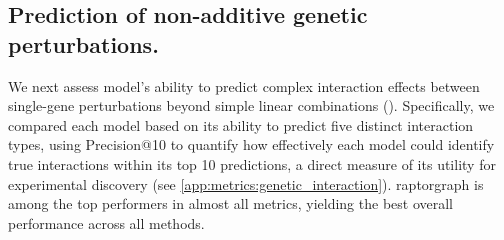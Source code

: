 \begin{table}
    \centering
    \vspace{-10pt}
    \vspace{-0.5\baselineskip}
    \caption{}
    \label{tab:objective_results_replogle}
    \vspace{-\baselineskip}
\end{table}

\subsection{Prediction of non-additive genetic perturbations.} 
We next assess model's ability to predict complex interaction effects between single-gene perturbations beyond simple linear combinations  ().
Specifically, we compared each model based on its ability to predict five distinct interaction types, using Precision@10 to quantify how effectively each model could identify true interactions within its top 10 predictions, a direct measure of its utility for experimental discovery (see \cref{app:metrics:genetic_interaction}). \gls{raptorgraph} is among the top performers in almost all metrics, yielding the best overall performance across all methods.  

\begin{table}[htb]
\centering
\caption{Comparison of non-additive genetic interaction prediction. Precision@10 scores for five baseline models across distinct genetic interaction subtypes on the Norman et al. dataset. Higher is better. Bold: best results; Italics: second best.}
\label{tab:gi_scores}
\vskip 0.15in
\begin{center}
\begin{small}
\end{small}
\end{center}
\vskip -0.1in
\end{table}

